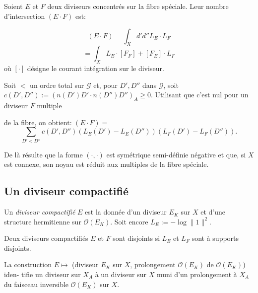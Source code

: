 \documentclass[12pt,a4paper]{article}
\theoremstyle{plain}
\theoremstyle{definition}
\newcommand{\Oo}{\mathscr{O}}
\begin{document}
\subsection{}

Soient $E$ et $F$ deux diviseurs concentr\'es sur la fibre sp\'eciale. Leur nombre
d'intersection $(E \cdot F)$ est:

\smallskip

\begin{minipage}[t]{0.48\textwidth}
\[
(E \cdot F) = \int_X d'd'' L_E \cdot L_F
\]
\[
= \int_X L_E \cdot [F_F] + [F_E] \cdot L_F
\]
o\`u $[\cdot]$ d\'esigne le courant
int\'egration sur le diviseur.
\end{minipage}
\hfill
\begin{minipage}[t]{0.48\textwidth}
Soit $<$ un ordre total sur $\mathcal{G}$ et, pour
$D', D''$ dans $\mathcal{G}$, soit $c(D', D'') :=
(n(D') D' \cdot n(D'') D'')_A \geq 0$. Utilisant que
c'est nul pour un diviseur $F$ multiple

de la fibre, on obtient: $(E \cdot F) =$
\[
\sum_{D' < D''} c(D', D'') (L_E(D') - L_E(D'')) (L_F(D') - L_F(D'')) .
\]
\end{minipage}

\smallskip

De l\`a r\'esulte que la forme $(\cdot, \cdot)$ est sym\'etrique semi-d\'efinie n\'egative et que, si
$X$ est connexe, son noyau est r\'eduit aux multiples de la fibre sp\'eciale.

\subsection{Un diviseur compactifi\'e}

\begin{minipage}[t]{0.48\textwidth}
Un \emph{diviseur compactifi\'e} $E$
est la donn\'ee d'un diviseur $E_K$
sur $X$ et d'une structure hermitienne
sur $\Oo(E_K)$. Soit encore
$L_E := -\log \|1\|^2$.

Deux diviseurs compactifi\'es $E$ et $F$ sont
disjoints si $L_E$ et $L_F$ sont \`a supports
disjoints.
\end{minipage}
\hfill
\begin{minipage}[t]{0.48\textwidth}
La construction $E \mapsto$ (diviseur $E_K$ sur
$X$, prolongement $\Oo(E_K)$ de $\Oo(E_K)$) iden-
tifie un diviseur sur $X_A$ \`a un diviseur
sur $X$ muni d'un prolongement \`a
$X_A$ du faisceau inversible $\Oo(E_K)$ sur
$X$.
\end{minipage}
\end{document}
